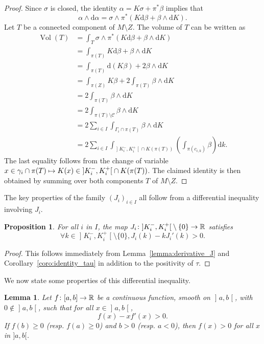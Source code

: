 \documentclass[10pt,a4paper]{amsart}
\DeclareMathOperator{\vol}{Vol}
\newcommand{\bbR}{\mathbb{R}}
\newcommand{\clC}{\mathcal{C}}
\newcommand{\rmd}{\mathrm{d}}
\renewcommand*{\to}{\mathchoice{\longrightarrow}{\rightarrow}{\rightarrow}{\rightarrow}}
\let\oldmapsto\mapsto
\renewcommand*{\mapsto}{\mathchoice{\longmapsto}{\oldmapsto}{\oldmapsto}{\oldmapsto}}
\let\oldforall\forall
\renewcommand*{\forall}{\mathrel{\oldforall}}
\newtheorem{lemm}[theo]{Lemma}
\newtheorem{prop}[theo]{Proposition}
\theoremstyle{definition}\newtheorem{defi}[theo]{Definition}
\begin{document}
\begin{proof}
Since $\sigma$ is closed, the identity $\alpha = K \sigma + \pi ^* \beta$ implies that
\[
\alpha \wedge \rmd \alpha = \sigma \wedge \pi^* (K \rmd \beta + \beta \wedge \rmd K).
\]
Let $T$ be a connected component of $M \setminus Z$. The volume of $T$ can be written as
\begin{align*}
\vol(T)&= \int_T \sigma \wedge \pi^* (K \rmd \beta + \beta \wedge \rmd K) \\
&=\int_{\pi(T)} K \rmd \beta + \beta \wedge \rmd K \\
&=\int_{\pi(T)} \rmd (K \beta) + 2 \beta \wedge \rmd K \\
&=\int_{\pi(Z)}K \beta + 2\int_{\pi(T)} \beta \wedge \rmd K \\
&=2\int_{\pi(T)} \beta \wedge \rmd K \\
&=2\int_{\pi(T) \setminus \clC} \beta \wedge \rmd K \\
&=2\sum_{i \in I} \int_{\Gamma_i \cap \pi(T)} \beta \wedge \rmd K \\
&=2\sum_{i \in I} \int_{\mathopen{]}K_i^-, K_i^+\mathclose{[} \cap K(\pi(T))} \left(\int_{\pi(c_{i,k})}\beta\right) \rmd k.
\end{align*}
The last equality follows from the change of variable $x \in \gamma_i \cap \pi(T) \mapsto K(x) \in\mathopen{]}K_i^-, K_i^+\mathclose{[}\cap K(\pi(T))$. The claimed identity is then obtained by summing over both components $T$ of $M \setminus Z$.
\end{proof}

The key properties of the family $(J_i)_{i \in I}$ all follow from a differential inequality involving $J_i$.

\begin{prop}\label{prop:ineq_diff_J}
For all $i$ in $I$, the map $J_i \colon\mathopen{]}K_i^-, K_i^+\mathclose{[}\setminus\{0\} \to \bbR$ satisfies
\[
\forall k \in\mathopen{]}K_i^-, K_i^+\mathclose{[}\setminus\{0\}, J_i(k) - k J_i'(k) > 0.
\]
\end{prop}

\begin{proof}
This follows immediately from Lemma~\ref{lemma:derivative_J} and Corollary~\ref{coro:identity_tau} in addition to the positivity of $\tau$.
\end{proof}

We now state some properties of this differential inequality.

\begin{lemm}\label{lemma:proprietes_J}
Let $f \colon [a,b] \to \bbR$ be a continuous function, smooth on $\mathopen{]}a,b\mathclose{[}$, with $0 \notin\mathopen{]}a,b\mathclose{[}$, such that for all $x \in\mathopen{]}a,b\mathclose{[}$,
\begin{equation}
f(x) - x f'(x) > 0.\label{eq:ineq_diff}
\end{equation}
If $f(b) \geq 0$ (resp. $f(a) \geq 0$) and $b > 0$ (resp. $a < 0$), then $f(x) > 0$ for all $x$ in $]a,b[$.
\end{lemm}
\end{document}
